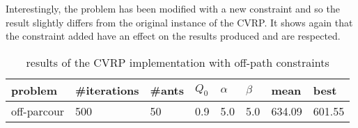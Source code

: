 Interestingly, the problem has been modified with a new constraint and so the result slightly differs from the original instance of the CVRP. It shows again that the constraint added have an effect on the results produced and are respected.

\begin{table}
\centering
\small
\begin{tabular}{|l|l|l|l|l|l|l|l|}
\hline
problem & \#iterations & \#ants & $Q_0$ & $\alpha$ & $\beta$ & mean & best  \\
\hline
\hline
off-parcour & 500 & 50 & 0.9 & 5.0 & 5.0 & 634.09 & 601.55  \\
\hline
\end{tabular}
\caption{results of the CVRP implementation with off-path constraints}
\label{tab:cvrpoff}
\end{table}